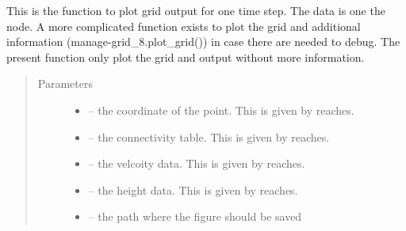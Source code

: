 \documentclass[letterpaper,10pt,english]{sphinxmanual}
\begin{document}

\begin{fulllineitems}
\label{\detokenize{index:src.manage_grid_8.plot_grid_simple}}
This is the function to plot grid output for one time step. The data is one the node. A more complicated function
exists to plot the grid and additional information (manage-grid\_8.plot\_grid()) in case there are needed to debug.
The present function only plot the grid and output without more information.
\begin{quote}\begin{description}
\item[{Parameters}] \leavevmode\begin{itemize}
\item {} 
 -- the coordinate of the point. This is given by reaches.

\item {} 
 -- the connectivity table. This is given by reaches.

\item {} 
 -- the velcoity data. This is given by reaches.

\item {} 
 -- the height data. This is given by reaches.

\item {} 
 -- the path where the figure should be saved

\end{itemize}

\end{description}\end{quote}

\end{fulllineitems}

\end{document}
